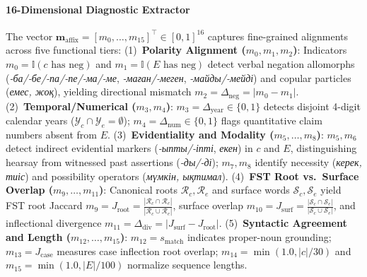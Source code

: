 \paragraph{16-Dimensional Diagnostic Extractor}
The vector $\mathbf{m}_{\text{affix}} = [m_0, \dots, m_{15}]^{\top} \in [0, 1]^{16}$ captures fine-grained alignments across five functional tiers:
(1)~\textbf{Polarity Alignment ($m_0, m_1, m_2$)}: Indicators $m_0 = \mathbb{I}(c \text{ has neg})$ and $m_1 = \mathbb{I}(E \text{ has neg})$ detect verbal negation allomorphs (\textit{-ба/-бе/-па/-пе/-ма/-ме}, \textit{-маған/-меген}, \textit{-майды/-мейді}) and copular particles (\textit{емес, жоқ}), yielding directional mismatch $m_2 = \Delta_{\text{neg}} = |m_0 - m_1|$.
(2)~\textbf{Temporal/Numerical ($m_3, m_4$)}: $m_3 = \Delta_{\text{year}} \in \{0, 1\}$ detects disjoint 4-digit calendar years ($\mathcal{Y}_c \cap \mathcal{Y}_e = \emptyset$); $m_4 = \Delta_{\text{num}} \in \{0, 1\}$ flags quantitative claim numbers absent from $E$.
(3)~\textbf{Evidentiality and Modality ($m_5, \dots, m_8$)}: $m_5, m_6$ detect indirect evidential markers (\textit{-ыпты/-іпті}, \textit{екен}) in $c$ and $E$, distinguishing hearsay from witnessed past assertions (\textit{-ды/-ді}); $m_7, m_8$ identify necessity (\textit{керек, тиіс}) and possibility operators (\textit{мүмкін, ықтимал}).
(4)~\textbf{FST Root vs.\ Surface Overlap ($m_9, \dots, m_{11}$)}: Canonical roots $\mathcal{R}_c, \mathcal{R}_e$ and surface words $\mathcal{S}_c, \mathcal{S}_e$ yield FST root Jaccard $m_9 = J_{\text{root}} = \frac{|\mathcal{R}_c \cap \mathcal{R}_e|}{|\mathcal{R}_c \cup \mathcal{R}_e|}$, surface overlap $m_{10} = J_{\text{surf}} = \frac{|\mathcal{S}_c \cap \mathcal{S}_e|}{|\mathcal{S}_c \cup \mathcal{S}_e|}$, and inflectional divergence $m_{11} = \Delta_{\text{div}} = |J_{\text{surf}} - J_{\text{root}}|$.
(5)~\textbf{Syntactic Agreement and Length ($m_{12}, \dots, m_{15}$)}: $m_{12} = s_{\text{match}}$ indicates proper-noun grounding; $m_{13} = J_{\text{case}}$ measures case inflection root overlap; $m_{14} = \min(1.0, |c| / 30)$ and $m_{15} = \min(1.0, |E| / 100)$ normalize sequence lengths.

